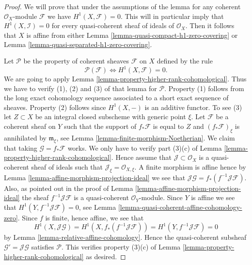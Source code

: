 \documentclass{stacks-project}
\theoremstyle{plain}
\theoremstyle{definition}
\theoremstyle{remark}
\numberwithin{equation}{subsection}
\begin{document}
\begin{proof}
We will prove that under the assumptions of the lemma for any coherent
$\mathcal{O}_X$-module $\mathcal{F}$ we have $H^1(X, \mathcal{F}) = 0$.
This will in particular imply that $H^1(X, \mathcal{I}) = 0$
for every quasi-coherent sheaf of ideals of $\mathcal{O}_X$. Then it
follows that $X$ is affine from either
Lemma \ref{lemma-quasi-compact-h1-zero-covering} or
Lemma \ref{lemma-quasi-separated-h1-zero-covering}.

\medskip\noindent
Let $\mathcal{P}$ be the property of coherent sheaves
$\mathcal{F}$ on $X$ defined by the rule
$$
\mathcal{P}(\mathcal{F}) \Leftrightarrow H^1(X, \mathcal{F}) = 0.
$$
We are going to apply Lemma \ref{lemma-property-higher-rank-cohomological}.
Thus we have to verify (1), (2) and (3) of that lemma for $\mathcal{P}$.
Property (1) follows from the long exact cohomology sequence associated
to a short exact sequence of sheaves. Property (2) follows since
$H^1(X, -)$ is an additive functor. To see (3) let $Z \subset X$ be
an integral closed subscheme with generic point $\xi$.
Let $\mathcal{F}$ be a coherent sheaf on $Y$ such that
the support of $f_*\mathcal{F}$ is equal to $Z$
and $(f_*\mathcal{F})_\xi$ is annihilated by $\mathfrak m_\xi$,
see Lemma \ref{lemma-finite-morphism-Noetherian}. We claim that
taking $\mathcal{G} = f_*\mathcal{F}$ works. We only have to verify
part (3)(c) of Lemma \ref{lemma-property-higher-rank-cohomological}.
Hence assume that $\mathcal{J} \subset \mathcal{O}_X$ is a
quasi-coherent sheaf of ideals such that
$\mathcal{J}_\xi = \mathcal{O}_{X, \xi}$.
A finite morphism is affine hence by
Lemma \ref{lemma-affine-morphism-projection-ideal} we see that
$\mathcal{J}\mathcal{G} = f_*(f^{-1}\mathcal{J}\mathcal{F})$.
Also, as pointed out in the proof of
Lemma \ref{lemma-affine-morphism-projection-ideal} the sheaf
$f^{-1}\mathcal{J}\mathcal{F}$ is a quasi-coherent $\mathcal{O}_Y$-module.
Since $Y$ is affine we see that $H^1(Y, f^{-1}\mathcal{J}\mathcal{F}) = 0$,
see Lemma \ref{lemma-quasi-coherent-affine-cohomology-zero}.
Since $f$ is finite, hence affine, we see that
$$
H^1(X, \mathcal{J}\mathcal{G}) =
H^1(X, f_*(f^{-1}\mathcal{J}\mathcal{F})) =
H^1(Y, f^{-1}\mathcal{J}\mathcal{F}) = 0
$$
by Lemma \ref{lemma-relative-affine-cohomology}.
Hence the quasi-coherent subsheaf $\mathcal{G}' = \mathcal{J}\mathcal{G}$
satisfies $\mathcal{P}$. This verifies property (3)(c) of
Lemma \ref{lemma-property-higher-rank-cohomological} as desired.
\end{proof}
\end{document}

